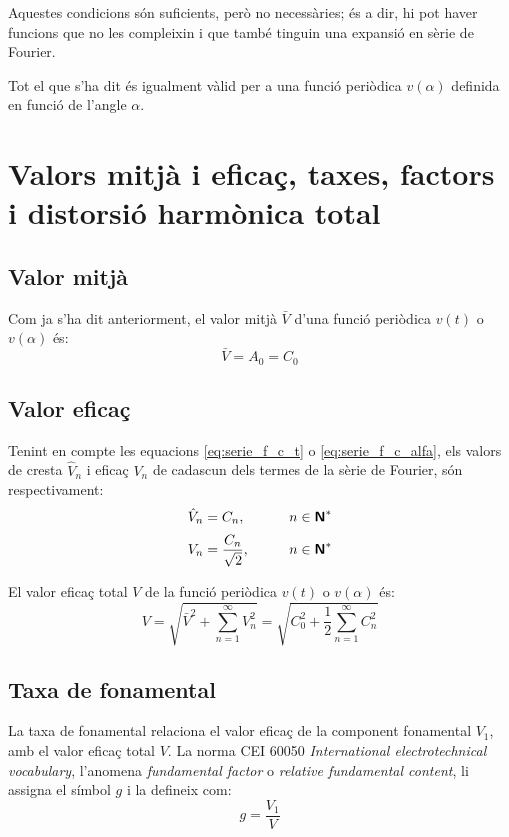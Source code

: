 Aquestes condicions són suficients, però no necessàries; és a dir, hi pot haver funcions que no les compleixin i que també tinguin una expansió en sèrie de Fourier.

Tot el que s'ha dit és igualment vàlid per a una funció periòdica
$v(\alpha)$  definida en funció de l'angle $\alpha$.


\section{Valors mitjà i eficaç, taxes, factors i distorsió harmònica total}\label{sec:four_val_mitja_ef}

\subsection{Valor mitjà}\label{sec:four_val_av}

Com ja s'ha dit anteriorment, el valor mitjà $\bar{V}$ d'una
funció periòdica $v(t)$ o $v(\alpha)$ és:
\begin{equation}
    \bar{V} = A_0 = C_0\label{eq:fourier_ave}
\end{equation}

\subsection{Valor eficaç}\label{sec:four_val_ef}

Tenint en compte les equacions  \eqref{eq:serie_f_c_t} o
\eqref{eq:serie_f_c_alfa}, els valors de cresta $\hat{V}_n$ i eficaç
$V_n$ de cadascun dels termes de la sèrie de Fourier, són respectivament:
\begin{alignat}{2}
    \hat{V}_n &= C_n, &\qquad n \in {\ensuremath{\boldsymbol{\mathsf{N}}}}^*\\[0.5ex]
    V_n &= \frac{C_n}{\sqrt{2}}, &\qquad n \in {\ensuremath{\boldsymbol{\mathsf{N}}}}^*\label{eq:fourier_efi}
\end{alignat}

El valor eficaç total $V$ de  la funció periòdica $v(t)$ o
$v(\alpha)$ és:
\begin{equation}
    V = \sqrt{\bar{V}^2 + \sum_{n=1}^{\infty}V^2_n} =
     \sqrt{C^2_0 + \frac{1}{2} \sum_{n=1}^{\infty}C^2_n}
     \label{eq:val_ef_fourier}
\end{equation}

\subsection{Taxa de fonamental}
La taxa  de fonamental relaciona el valor eficaç de la component fonamental $V_1$, amb el valor eficaç
total $V$. La norma CEI 60050 \textit{International electrotechnical vocabulary}, l'anomena \textit{fundamental factor} o \textit{relative fundamental content}, li assigna el símbol $g$ i la defineix com:
\begin{equation}
    g = \frac{V_1}{V}
\end{equation}

